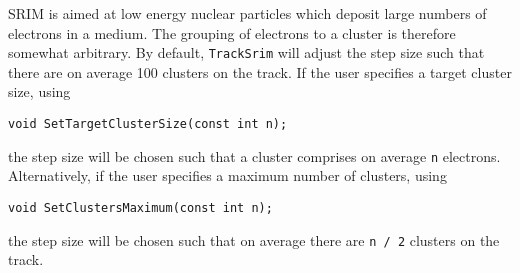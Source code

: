 SRIM is aimed at low energy nuclear particles which deposit large numbers of electrons in a medium. 
The grouping of electrons to a cluster is therefore somewhat arbitrary. 
By default, \texttt{TrackSrim} will adjust the step size such that 
there are on average 100 clusters on the track.
If the user specifies a target cluster size, using
\begin{lstlisting}
void SetTargetClusterSize(const int n);
\end{lstlisting}
the step size will be chosen such that a cluster comprises on average 
\texttt{n} electrons. Alternatively, if the user specifies a maximum 
number of clusters, using
\begin{lstlisting}
void SetClustersMaximum(const int n);
\end{lstlisting}
the step size will be chosen such that on average there are 
\texttt{n / 2} clusters on the track. 
